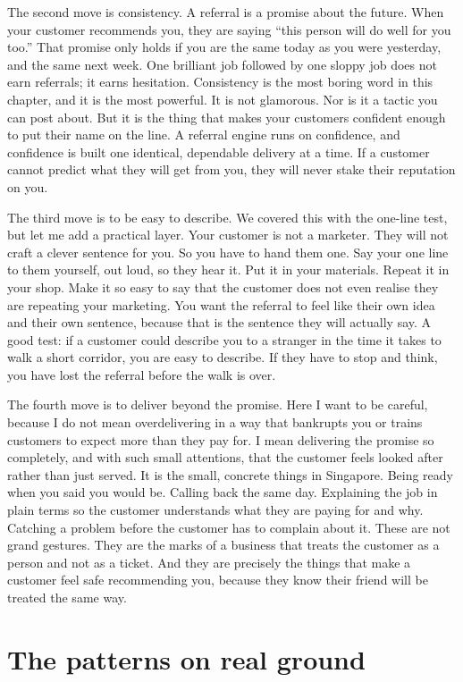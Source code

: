 \documentclass[10pt,twoside,openany]{memoir}
\newcommand{\needspacehead}{\needspace{4\baselineskip}}
\let\oldsection\section
\renewcommand{\section}{\needspacehead\oldsection}
\begin{document}
{The second move is consistency. A referral is a promise about the
future. When your customer recommends you, they are saying ``this person
will do well for you too.'' That promise only holds if you are the same
today as you were yesterday, and the same next week. One brilliant job
followed by one sloppy job does not earn referrals; it earns hesitation.
Consistency is the most boring word in this chapter, and it is the most
powerful. It is not glamorous. Nor is it a tactic you can post about.
But it is the thing that makes your customers confident enough to put
their name on the line. A referral engine runs on confidence, and
confidence is built one identical, dependable delivery at a time. If a
customer cannot predict what they will get from you, they will never
stake their reputation on you.

The third move is to be easy to describe. We covered this with the
one-line test, but let me add a practical layer. Your customer is not a
marketer. They will not craft a clever sentence for you. So you have to
hand them one. Say your one line to them yourself, out loud, so they
hear it. Put it in your materials. Repeat it in your shop. Make it so
easy to say that the customer does not even realise they are repeating
your marketing. You want the referral to feel like their own idea and
their own sentence, because that is the sentence they will actually say.
A good test: if a customer could describe you to a stranger in the time
it takes to walk a short corridor, you are easy to describe. If they
have to stop and think, you have lost the referral before the walk is
over.

The fourth move is to deliver beyond the promise. Here I want to be
careful, because I do not mean overdelivering in a way that bankrupts
you or trains customers to expect more than they pay for. I mean
delivering the promise so completely, and with such small attentions,
that the customer feels looked after rather than just served. It is the
small, concrete things in Singapore. Being ready when you said you would
be. Calling back the same day. Explaining the job in plain terms so the
customer understands what they are paying for and why. Catching a
problem before the customer has to complain about it. These are not
grand gestures. They are the marks of a business that treats the
customer as a person and not as a ticket. And they are precisely the
things that make a customer feel safe recommending you, because they
know their friend will be treated the same way.

\section{The patterns on real ground}\label{the-patterns-on-real-ground}

}
\end{document}
